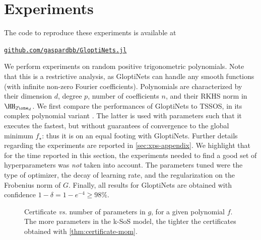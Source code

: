 \documentclass{article}
\begin{document}
\section{Experiments}\label{sec:xps}

The code to reproduce these experiments is available at
\begin{center}
  \href{https://github.com/gaspardbb/GloptiNets.jl}{\texttt{github.com/gaspardbb/GloptiNets.jl}}
\end{center}


We perform experiments on random positive trigonometric polynomials. Note that this is a restrictive analysis, as GloptiNets can handle any smooth functions (\ie with infinite non-zero Fourier coefficients). Polynomials are characterized by their dimension $d$, degree $p$, number of coefficients $n$, and their RKHS norm in $\HH_{2\one_d}$. We first compare the performances of GloptiNets to TSSOS, in its complex polynomial variant \cite{wangExploitingSparsityComplex2022}. The latter is used with parameters such that it executes the fastest, but without guarantees of convergence to the global minimum $f_\star$: thus it is on an equal footing with GloptiNets. Further details regarding the experiments are reported in \cref{sec:xps-appendix}.
We highlight that for the time reported in this section, the experiments needed to find a good set of hyperparameters was \emph{not} taken into account.
The parameters tuned were the type of optimizer, the decay of learning rate, and the regularization on the Frobenius norm of $G$.
Finally, all results for GloptiNets are obtained with confidence $1 - \delta = 1 - e^{-4} \geq 98\%$.

\begin{figure}
  \centering
  
  \caption{Certificate \emph{vs.} number of parameters in $g$, for a given polynomial $f$. The more parameters in the k-SoS model, the tighter the certificates obtained with \cref{thm:certificate-mom}.}
  \label{fig:xp-params}
\end{figure}
\end{document}
